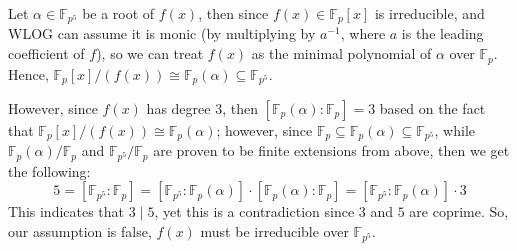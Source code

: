 \documentclass{article}
\begin{document}
Let $\alpha\in\mathbb{F}_{p^5}$ be a root of $f(x)$, then since $f(x)\in\mathbb{F}_p[x]$ is irreducible, and WLOG can assume it is monic (by multiplying by $a^{-1}$, where $a$ is the leading coefficient of $f$), so we can treat $f(x)$ as the minimal polynomial of $\alpha$ over $\mathbb{F}_p$. Hence, $\mathbb{F}_p[x]/(f(x))\cong \mathbb{F}_p(\alpha)\subseteq \mathbb{F}_{p^5}$.

However, since $f(x)$ has degree $3$, then $[\mathbb{F}_p(\alpha):\mathbb{F}_p] = 3$ based on the fact that $\mathbb{F}_p[x]/(f(x))\cong \mathbb{F}_p(\alpha)$; however, since $\mathbb{F}_p\subseteq \mathbb{F}_p(\alpha)\subseteq \mathbb{F}_{p^5}$, while $\mathbb{F}_p(\alpha)/\mathbb{F}_p$ and $\mathbb{F}_{p^5}/\mathbb{F}_p$ are proven to be finite extensions from above, then we get the following:
$$5=[\mathbb{F}_{p^5}:\mathbb{F}_p] = [\mathbb{F}_{p^5}:\mathbb{F}_p(\alpha)]\cdot [\mathbb{F}_p(\alpha):\mathbb{F}_p] = [\mathbb{F}_{p^5}:\mathbb{F}_p(\alpha)]\cdot 3$$
This indicates that $3\mid 5$, yet this is a contradiction since $3$ and $5$ are coprime. So, our assumption is false, $f(x)$ must be irreducible over $\mathbb{F}_{p^5}$.
\end{document}
